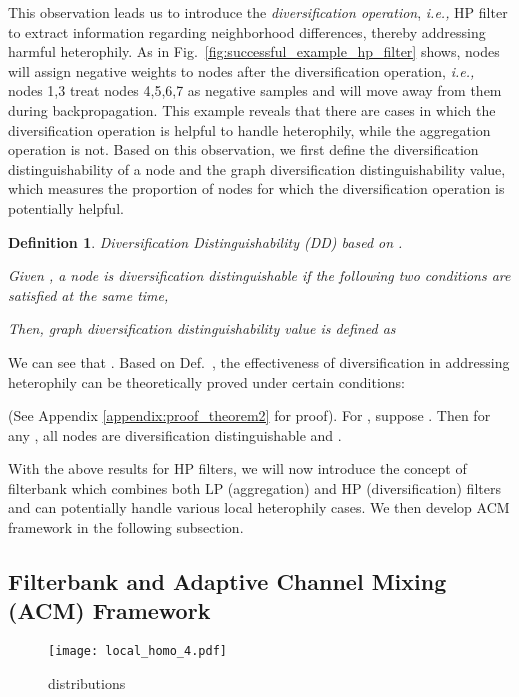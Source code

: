 \documentclass{article}
\newcommand\ie{\textit{i.e.,}}
\newcommand{\0}{{\boldsymbol{0}}}
\newcommand{\6}{{\partial}}
\newcommand{\8}{{\infty}}
\newcommand{\4}{{\nabla}}
\newenvironment{theorem}[2][Theorem]{\begin{trivlist}
		\item[\hskip \labelsep {\bfseries #1}\hskip \labelsep {\bfseries #2.}]}{\end{trivlist}}
\newtheorem{definition}{Definition}
\begin{document}
This observation leads us to introduce the \textit{diversification operation}, \ie{} HP filter  \cite{ekambaram2014graph} to extract information regarding neighborhood differences, thereby addressing harmful heterophily. As  in Fig.~\ref{fig:successful_example_hp_filter} shows, nodes  will assign negative weights to nodes  after the diversification operation, \ie{} nodes 1,3 treat nodes 4,5,6,7 as negative samples and will move away from them during backpropagation. This example reveals that there are cases in which the diversification operation is helpful to handle heterophily, while the aggregation operation is not. Based on this observation, we first define the diversification distinguishability of a node and the graph diversification distinguishability value,  which measures the proportion of nodes for which the diversification operation is potentially helpful.

\begin{definition} Diversification Distinguishability (DD) based on .

Given , a node  is diversification distinguishable if the following two conditions are satisfied at the same time,
\vspace{-0.2cm}

\vspace{-0.3cm}
Then, graph diversification distinguishability value is defined as


\end{definition}
\vspace{-0.2cm}
We can see that . Based on Def.~, the effectiveness of diversification in addressing heterophily can be theoretically proved under certain conditions:
\vspace{-0.2cm}
\begin{theorem} 1
(See Appendix \ref{appendix:proof_theorem2} for proof). 
For , suppose . Then for any , all nodes are diversification distinguishable and .
\end{theorem}
\vspace{-0.2cm}
With the above results for HP filters, we will now introduce the concept of filterbank which combines both LP (aggregation) and HP (diversification) filters and can potentially handle various local heterophily cases. We then develop ACM framework in the following subsection.
\vspace{-0.3cm}
\subsection{Filterbank and Adaptive Channel Mixing (ACM) Framework}
\vspace{-0.1cm}
\label{sec:filterbank_acm_gnn_architecture}
\begin{wrapfigure}{R}{0.3\textwidth}
  \begin{center}
    \texttt{[image: local\_homo\_4.pdf]}
  \end{center}
  \caption{ distributions}
  \label{fig:local_homophily_4}
\end{wrapfigure}
\end{document}
